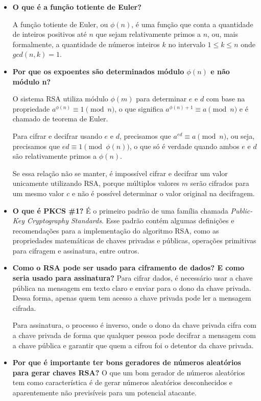 \documentclass[12pt]{article}
\begin{document}
\begin{itemize}
    \item \textbf{O que é a função totiente de Euler?}\par
        A função totiente de Euler, ou $\phi(n)$, é uma função que conta a
        quantidade de inteiros positivos até $n$ que sejam relativamente primos
        a $n$, ou, mais formalmente, a quantidade de números inteiros $k$ no
        intervalo $1 \leq k \leq n$ onde $gcd(n, k) = 1$.
        \newline
    \item \textbf{Por que os expoentes são determinados módulo $\phi(n)$ e não
        módulo n?}\par
        O sistema RSA utiliza módulo $\phi(m)$ para determinar $e$ e $d$ com
        base na propriedade $a^{\phi(n)} \equiv 1 \pmod{n}$, o que significa
        $a^{\phi(n)+1} \equiv a \pmod{n}$ e é chamado de teorema de Euler.

        Para cifrar e decifrar usando $e$ e $d$, precisamos que
        $a^{ed} \equiv a \pmod{n}$, ou seja, precisamos que
        $ed \equiv 1 \pmod{\phi(n)}$, o que só é verdade quando ambos $e$ e $d$
        são relativamente primos a $\phi(n)$.

        Se essa relação não se manter, é impossível cifrar e decifrar um valor
        unicamente utilizando RSA, porque múltiplos valores $m$ serão cifrados
        para um mesmo valor $c$ e não é possível determinar o valor original
        na decifragem.
        \newline
    \item \textbf{O que é PKCS \#1?}
        É o primeiro padrão de uma família chamada
        \textit{Public-Key Cryptography Standards}. Esse padrão contém algumas
        definições e recomendações para a implementação do algoritmo RSA, como
        as propriedades matemáticas de chaves privadas e públicas, operações
        primitivas para cifragem e assinatura, entre outros.
        \newline
    \item \textbf{Como o RSA pode ser usado para ciframento de dados? E como
        seria usado para assinatura?}
        Para cifrar dados, é necessário usar a chave pública na mensagem em
        texto claro e enviar para o dono da chave privada. Dessa forma, apenas
        quem tem acesso a chave privada pode ler a mensagem cifrada.

        Para assinatura, o processo é inverso, onde o dono da chave privada
        cifra com a chave privada de forma que qualquer pessoa pode decifrar a
        mensagem com a chave pública e garantir que quem a cifrou foi o
        detentor da chave privada.
        \newline
    \item \textbf{Por que é importante ter bons geradores de números aleatórios
        para gerar chaves RSA?}
        O que um bom gerador de números aleatórios tem como característica é de
        gerar números aleatórios desconhecidos e aparentemente não previsíveis
        para um potencial atacante.


\end{itemize}
\end{document}
